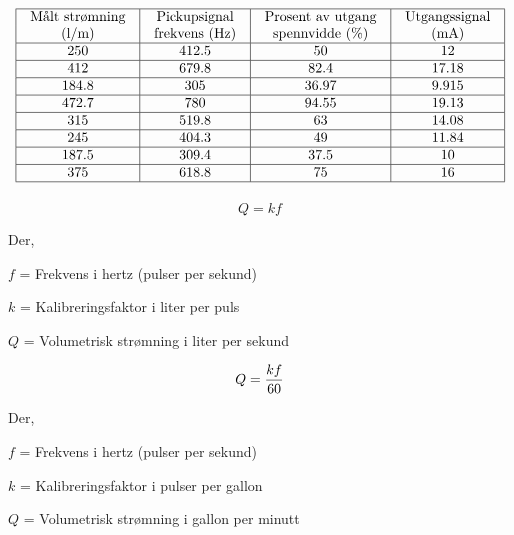 






$$\vbox{\offinterlineskip
\halign{\strut
\vrule \quad\hfil # \ \hfil & 
\vrule \quad\hfil # \ \hfil & 
\vrule \quad\hfil # \ \hfil & 
\vrule \quad\hfil # \ \hfil \vrule \cr
\noalign{\hrule}
%
Målt strømning & Pickupsignal & Prosent av utgang & Utgangssignal \cr
%
(l/m) & frekvens (Hz) & spennvidde (\%) & (mA) \cr
%
\noalign{\hrule}
%
250 & 412.5 & 50 & 12 \cr
%
\noalign{\hrule}
%
412 & 679.8 & 82.4 & 17.18 \cr
%
\noalign{\hrule}
%
184.8 & 305 & 36.97 & 9.915 \cr
%
\noalign{\hrule}
%
472.7 & 780 & 94.55 & 19.13 \cr
%
\noalign{\hrule}
%
315 & 519.8 & 63 & 14.08 \cr
%
\noalign{\hrule}
%
245 & 404.3 & 49 & 11.84 \cr
%
\noalign{\hrule}
%
187.5 & 309.4 & 37.5 & 10 \cr
%
\noalign{\hrule}
%
375 & 618.8 & 75 & 16 \cr
%
\noalign{\hrule}
} %
}$$ %

$$Q = kf$$

\noindent
Der,

$f$ = Frekvens i hertz (pulser per sekund)

$k$ = Kalibreringsfaktor i liter per puls

$Q$ = Volumetrisk strømning i liter per sekund

\vskip 10pt

$$Q = {kf \over 60}$$

\noindent
Der,

$f$ = Frekvens i hertz (pulser per sekund)

$k$ = Kalibreringsfaktor i pulser per gallon

$Q$ = Volumetrisk strømning i gallon per minutt










